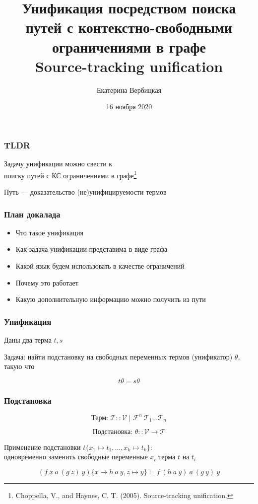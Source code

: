 \documentclass[aspectratio=169]{beamer}
\title[]{Унификация посредством поиска путей с контекстно-свободными ограничениями в графе \\ Source-tracking unification}
\subtitle[]{}
\institute[]{
Лаборатория языковых инструментов JetBrains\\
}
\author[]{Екатерина Вербицкая}
\date{16 ноября 2020}
\begin{document}
{
  \begin{frame}
    \titlepage
  \end{frame}
}


\begin{frame}[fragile]
  \frametitle{TLDR}
\begin{center}
  Задачу унификации можно свести к \\ поиску путей с КС ограничениями в графе\footnote{Choppella, V., and Haynes, C. T. (2005). Source-tracking unification.}

  \bigskip

  Путь --- доказательство (не)унифицируемости термов
\end{center}
\end{frame}

\begin{frame}[fragile]
  \frametitle{План докалада}
\begin{itemize}
  \item Что такое унификация
  \item Как задача унификации представима в виде графа
  \item Какой язык будем использовать в качестве ограничений
  \item Почему это работает
  \item Какую дополнительную информацию можно получить из пути
\end{itemize}

\end{frame}

\begin{frame}[fragile]
  \frametitle{Унификация}

  \begin{center}
    Даны два терма $t, s$
  \end{center}

  \begin{center}
    Задача: найти подстановку на свободных переменных термов (унификатор) $\theta$, такую что
  \end{center}
  \[
    t \theta = s \theta
  \]
\end{frame}


\begin{frame}[fragile]
  \frametitle{Подстановка}
  \[
    \text{Терм: } \mathcal{T} :: \mathcal{V} \mid \mathcal{F}^n \ \mathcal{T}_1 \dots \mathcal{T}_n
  \]

  \[
    \text{Подстановка: } \theta :: \mathcal{V} \to \mathcal{T}
  \]


  \begin{center}
    Применение подстановки $t\{x_1 \mapsto t_1, \dots, x_k \mapsto t_k\}$: \\ одновременно заменить свободные переменные $x_i$ терма $t$ на $t_i$
  \end{center}
  \[
     (f \ x \ a \ (g \ z) \ y)\{x \mapsto h \ a \ y, z \mapsto y\} = f \ (h \ a  \ y) \ a \ (g \ y) \ y
  \]
\end{frame}
\end{document}
